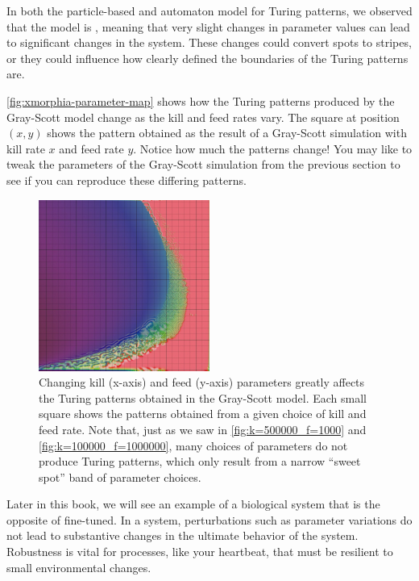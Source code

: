 In both the particle-based and automaton model for Turing patterns, we observed that the model is , meaning that very slight changes in parameter values can lead to significant changes in the system. These changes could convert spots to stripes, or they could influence how clearly defined the boundaries of the Turing patterns are.

\autoref{fig:xmorphia-parameter-map} shows how the Turing patterns produced by the Gray-Scott model change as the kill and feed rates vary. The square at position $(x, y)$ shows the pattern obtained as the result of a Gray-Scott simulation with kill rate $x$ and feed rate $y$. Notice how much the patterns change! You may like to tweak the parameters of the Gray-Scott simulation from the previous section to see if you can reproduce these differing patterns.\\

\begin{figure}[h]
\centering
\mySfFamily
\includegraphics[width = 0.5\textwidth]{../images/xmorphia-parameter-map}
\caption{Changing kill (x-axis) and feed (y-axis) parameters greatly affects the Turing patterns obtained in the Gray-Scott model. Each small square shows the patterns obtained from a given choice of kill and feed rate.  Note that, just as we saw in \autoref{fig:k=500000_f=1000} and \autoref{fig:k=100000_f=1000000}, many choices of parameters do not produce Turing patterns, which only result from a narrow ``sweet spot'' band of parameter choices.}
\label{fig:xmorphia-parameter-map}
\end{figure}

Later in this book, we will see an example of a biological system that is the opposite of fine-tuned. In a  system, perturbations such as parameter variations do not lead to substantive changes in the ultimate behavior of the system. Robustness is vital for processes, like your heartbeat, that must be resilient to small environmental changes.

